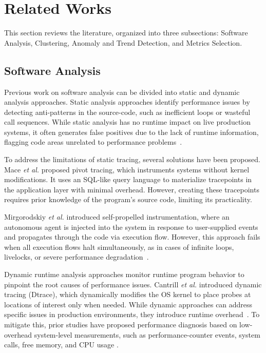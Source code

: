 \documentclass[pdflatex,sn-nature]{sn-jnl}%
\theoremstyle{thmstyleone}%
\theoremstyle{thmstyletwo}%
\theoremstyle{thmstylethree}%
\begin{document}
\section{Related Works} \label{rwork}
This section reviews the literature, organized into three subsections: Software Analysis, Clustering, Anomaly and Trend Detection, and Metrics Selection.


\subsection{Software Analysis}
Previous work on software analysis can be divided into static and dynamic analysis approaches. Static analysis approaches \cite{unknown-author-no-date,unknown-author-no-dateB} identify performance issues by detecting anti-patterns in the source-code, such as inefficient loops or wasteful call sequences. While static analysis has no runtime impact on live production systems, it often generates false positives due to the lack of runtime information, flagging code areas unrelated to performance problems~\cite{jin2012understanding,nistor2015caramel,dai2018hytrace}.

To address the limitations of static tracing, several solutions have been proposed. Mace \textit{et al.} \cite{mace2015pivot} proposed pivot tracing, which instruments systems without kernel modifications. It uses an SQL-like query language to materialize tracepoints in the application layer with minimal overhead. However, creating these tracepoints requires prior knowledge of the program's source code, limiting its practicality. 

Mirgorodskiy \textit{et al.} \cite{mirgorodskiy2006automated} introduced self-propelled instrumentation, where an autonomous agent is injected into the system in response to user-supplied events and propagates through the code via execution flow. However, this approach fails when all execution flows halt simultaneously, as in cases of infinite loops, livelocks, or severe performance degradation~\cite{jin2012understanding}.

Dynamic runtime analysis approaches \cite{arulraj2013production,dean2014perfscope} monitor runtime program behavior to pinpoint the root causes of performance issues. Cantrill \textit{et al.} \cite{cantrill2004dynamic} introduced dynamic tracing (Dtrace), which dynamically modifies the OS kernel to place probes at locations of interest only when needed. While dynamic approaches can address specific issues in production environments, they introduce runtime overhead~\cite{arulraj2013production,dean2014perfscope}.  To mitigate this, prior studies have proposed performance diagnosis based on low-overhead system-level measurements, such as performance-counter events, system calls, free memory, and CPU usage \cite{arulraj2013production,dean2014perfscope}.
\end{document}
